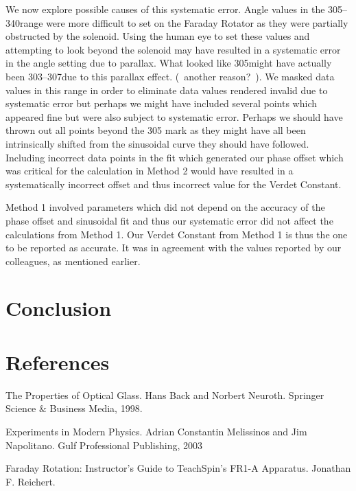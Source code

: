 \documentclass[prb,preprint]{revtex4-1}
\begin{document}
{{{{{{We now explore possible causes of this systematic error.  Angle values in the 305\degree--340\degree range were more difficult to set on the Faraday Rotator as they were partially obstructed by the solenoid.  Using the human eye to set these values and attempting to look beyond the solenoid may have resulted in a systematic error in the angle setting due to parallax.  What looked like 305\degree might have actually been 303\degree--307\degree due to this parallax effect.  (~another reason?~).  We masked data values in this range in order to eliminate data values rendered invalid due to systematic error but perhaps we might have included several points which appeared fine but were also subject to systematic error.  Perhaps we should have thrown out all points beyond the 305 \degree mark as they might have all been intrinsically shifted from the sinusoidal curve they should have followed.  Including incorrect data points in the fit which generated our phase offset which was critical for the calculation in Method 2 would have resulted in a systematically incorrect offset and thus incorrect value for the Verdet Constant.

Method 1 involved parameters which did not depend on the accuracy of the phase offset and sinusoidal fit and thus our systematic error did not affect the calculations from Method 1.  Our Verdet Constant from Method 1 is thus the one to be reported as accurate.  It was in agreement with the values reported by our colleagues, as mentioned earlier.
\section{Conclusion}


\section{References}

{The Properties of Optical Glass.  Hans Back and Norbert Neuroth.  Springer Science $\&$ Business Media, 1998.

Experiments in Modern Physics.  Adrian Constantin Melissinos and Jim Napolitano.  Gulf Professional Publishing, 2003

Faraday Rotation:  Instructor's Guide to TeachSpin's FR1-A Apparatus.  Jonathan F. Reichert.}

}}}}}}
\end{document}

